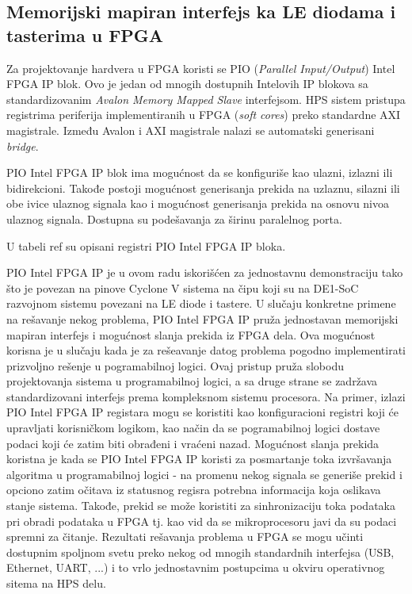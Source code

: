 \subsection{Memorijski mapiran interfejs ka LE diodama i tasterima u FPGA}
Za projektovanje hardvera u FPGA koristi se PIO (\textit{Parallel Input/Output}) Intel FPGA IP blok. Ovo je jedan od mnogih dostupnih Intelovih IP blokova sa standardizovanim \textit{Avalon Memory Mapped Slave} interfejsom. HPS sistem pristupa registrima periferija implementiranih u FPGA (\textit{soft cores}) preko standardne AXI magistrale. Između Avalon i AXI magistrale nalazi se automatski generisani \textit{bridge}.

PIO Intel FPGA IP blok ima mogućnost da se konfiguriše kao ulazni, izlazni ili bidirekcioni. Takođe postoji mogućnost generisanja prekida na uzlaznu, silazni ili obe ivice ulaznog signala kao i mogućnost generisanja prekida na osnovu nivoa ulaznog signala. Dostupna su podešavanja za širinu paralelnog porta.

U tabeli ref su opisani registri PIO Intel FPGA IP bloka.

PIO Intel FPGA IP je u ovom radu iskorišćen za jednostavnu demonstraciju tako što je povezan na pinove Cyclone V sistema na čipu koji su na DE1-SoC razvojnom sistemu povezani na LE diode i tastere. U slučaju konkretne primene na rešavanje nekog problema, PIO Intel FPGA IP pruža jednostavan memorijski mapiran interfejs i mogućnost slanja prekida iz FPGA dela. Ova mogućnost korisna je u slučaju kada je za rešeavanje datog problema pogodno implementirati prizvoljno rešenje u pogramabilnoj logici. Ovaj pristup pruža slobodu projektovanja sistema u programabilnoj logici, a sa druge strane se zadržava standardizovani interfejs prema kompleksnom sistemu procesora. Na primer, izlazi PIO Intel FPGA IP registara mogu se koristiti kao konfiguracioni registri koji će upravljati korisničkom logikom, kao način da se pogramabilnoj logici dostave podaci koji će zatim biti obrađeni i vraćeni nazad. Mogućnost slanja prekida koristna je kada se PIO Intel FPGA IP koristi za posmartanje toka izvršavanja algoritma u programabilnoj logici - na promenu nekog signala se generiše prekid i opciono zatim očitava iz statusnog regisra potrebna informacija koja oslikava stanje sistema. Takođe, prekid se može koristiti za sinhronizaciju toka podataka pri obradi podataka u FPGA tj. kao vid da se mikroprocesoru javi da su podaci spremni za čitanje. Rezultati rešavanja problema u FPGA se mogu učinti dostupnim spoljnom svetu preko nekog od mnogih standardnih interfejsa (USB, Ethernet, UART, ...) i to vrlo jednostavnim postupcima u okviru operativnog sitema na HPS delu.

